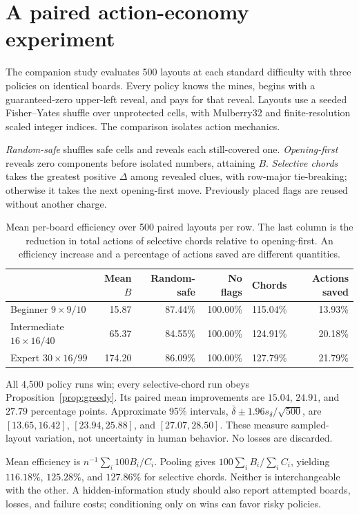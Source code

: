 \documentclass[11pt,letterpaper]{article}
\begin{document}
\section{A paired action-economy experiment}
The companion study evaluates 500 layouts at each standard difficulty with three policies on identical boards. Every policy knows the mines, begins with a guaranteed-zero upper-left reveal, and pays for that reveal. Layouts use a seeded Fisher--Yates shuffle over unprotected cells, with Mulberry32 and finite-resolution scaled integer indices. The comparison isolates action mechanics.

\emph{Random-safe} shuffles safe cells and reveals each still-covered one. \emph{Opening-first} reveals zero components before isolated numbers, attaining $B$. \emph{Selective chords} takes the greatest positive $\Delta$ among revealed clues, with row-major tie-breaking; otherwise it takes the next opening-first move. Previously placed flags are reused without another charge.

\begin{table}[tb]\centering\small
\begin{tabular}{lrrrrr}
\toprule
 & Mean $B$ & Random-safe & No flags & Chords & Actions saved\\
\midrule
Beginner $9\!\times\!9/10$ &15.87&87.44\%&100.00\%&115.04\%&13.93\%\\
Intermediate $16\!\times\!16/40$ &65.37&84.55\%&100.00\%&124.91\%&20.18\%\\
Expert $30\!\times\!16/99$ &174.20&86.09\%&100.00\%&127.79\%&21.79\%\\
\bottomrule
\end{tabular}
\caption{Mean per-board efficiency over 500 paired layouts per row. The last column is the reduction in total actions of selective chords relative to opening-first. An efficiency increase and a percentage of actions saved are different quantities.}
\label{tab:oracle}
\end{table}

All 4,500 policy runs win; every selective-chord run obeys Proposition~\ref{prop:greedy}. Its paired mean improvements are $15.04$, $24.91$, and $27.79$ percentage points. Approximate 95\% intervals, $\bar\delta\pm1.96s_\delta/\sqrt{500}$, are $[13.65,16.42]$, $[23.94,25.88]$, and $[27.07,28.50]$. These measure sampled-layout variation, not uncertainty in human behavior. No losses are discarded.

Mean efficiency is $n^{-1}\sum_i100B_i/C_i$. Pooling gives $100\sum_iB_i/\sum_iC_i$, yielding $116.18\%$, $125.28\%$, and $127.86\%$ for selective chords. Neither is interchangeable with the other. A hidden-information study should also report attempted boards, losses, and failure costs; conditioning only on wins can favor risky policies.
\end{document}
